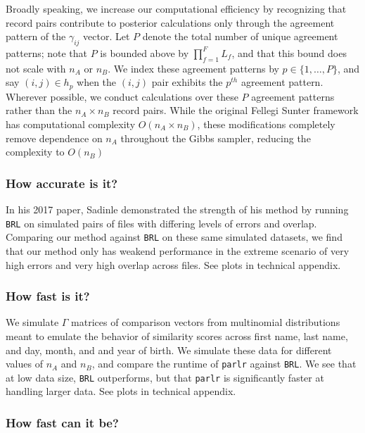 \documentclass[
  12pt,
]{article}
\begin{document}
Broadly speaking, we increase our computational efficiency by
recognizing that record pairs contribute to posterior calculations only
through the agreement pattern of the \(\gamma_{ij}\) vector. Let \(P\)
denote the total number of unique agreement patterns; note that \(P\) is
bounded above by \(\prod_{f=1}^F L_f\), and that this bound does not
scale with \(n_A\) or \(n_B\). We index these agreement patterns by
\(p \in \{1, \ldots, P\}\), and say \((i,j) \in h_p\) when the \((i,j)\)
pair exhibits the \(p^{th}\) agreement pattern. Wherever possible, we
conduct calculations over these \(P\) agreement patterns rather than the
\(n_A \times n_B\) record pairs. While the original Fellegi Sunter
framework has computational complexity \(O(n_A \times n_B)\), these
modifications completely remove dependence on \(n_A\) throughout the
Gibbs sampler, reducing the complexity to \(O(n_B)\)

\hypertarget{how-accurate-is-it}{%
\subsubsection{How accurate is it?}\label{how-accurate-is-it}}

In his 2017 paper, Sadinle demonstrated the strength of his method by
running \texttt{BRL} on simulated pairs of files with differing levels
of errors and overlap. Comparing our method against \texttt{BRL} on
these same simulated datasets, we find that our method only has weakend
performance in the extreme scenario of very high errors and very high
overlap across files. See plots in technical appendix.

\hypertarget{how-fast-is-it}{%
\subsubsection{How fast is it?}\label{how-fast-is-it}}

We simulate \(\Gamma\) matrices of comparison vectors from multinomial
distributions meant to emulate the behavior of similarity scores across
first name, last name, and day, month, and and year of birth. We
simulate these data for different values of \(n_A\) and \(n_B\), and
compare the runtime of \texttt{parlr} against \texttt{BRL}. We see that
at low data size, \texttt{BRL} outperforms, but that \texttt{parlr} is
significantly faster at handling larger data. See plots in technical
appendix.

\hypertarget{how-fast-can-it-be}{%
\subsubsection{How fast can it be?}\label{how-fast-can-it-be}}
\end{document}
